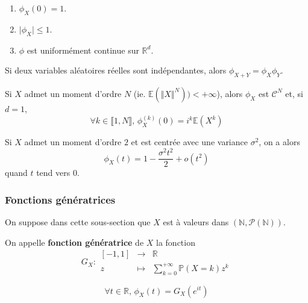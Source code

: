 	\begin{theorem}
		\begin{enumerate}[label=(\roman*)]
			\item $\phi_X(0) = 1$.
			\item $\vert \phi_X \vert \leq 1$.
			\item $\phi$ est uniformément continue sur $\mathbb{R}^d$.
		\end{enumerate}
	\end{theorem}

	\begin{proposition}
		Si deux variables aléatoires réelles sont indépendantes, alors $\phi_{X+Y} = \phi_X \phi_Y$.
	\end{proposition}

	\begin{theorem}
		Si $X$ admet un moment d'ordre $N$ (ie. $\mathbb{E}(\Vert X \Vert^N)) < +\infty$), alors $\phi_X$ est $\mathcal{C}^N$ et, si $d = 1$,
		\[ \forall k \in \llbracket 1, N \rrbracket, \, \phi_X^{(k)}(0) = i^k \mathbb{E}(X^k) \]
	\end{theorem}

	\begin{example}
		Si $X$ admet un moment d'ordre $2$ et est centrée avec une variance $\sigma^2$, on a alors
		\[ \phi_X(t) = 1 - \frac{\sigma^2 t^2}{2} + o(t^2) \]
		quand $t$ tend vers $0$.
	\end{example}

	\subsubsection{Fonctions génératrices}

	On suppose dans cette sous-section que $X$ est à valeurs dans $(\mathbb{N}, \mathcal{P}(\mathbb{N}))$.


	\begin{definition}
		On appelle \textbf{fonction génératrice} de $X$ la fonction
		\[
		G_X :
		\begin{array}{ccc}
			[-1,1] &\rightarrow& \mathbb{R} \\
			z &\mapsto& \sum_{k=0}^{+\infty} \mathbb{P}(X=k) z^k
		\end{array}
		\]
	\end{definition}


	\begin{remark}
		\[ \forall t \in \mathbb{R}, \, \phi_X(t) = G_X(e^{it}) \]
	\end{remark}

